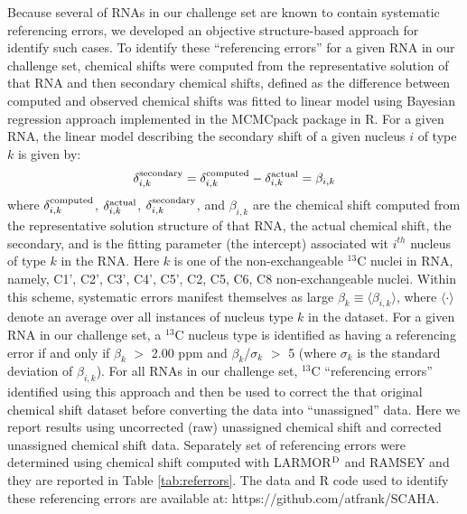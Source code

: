\documentclass[journal=jcisd8,manuscript=article,layout=onecolumn]{achemso}
\begin{document}
Because several of RNAs in our challenge set are known to contain systematic referencing errors\cite{aeschbacher2012procedure}, we developed an objective structure-based approach for identify such cases. To identify these ``referencing errors'' for a given RNA in our challenge set, chemical shifts were computed from the representative solution of that  RNA and then secondary chemical shifts, defined as the difference between computed and  observed chemical shifts was fitted to linear model using Bayesian regression approach implemented in the MCMCpack package in R\cite{martin2011mcmcpack}. For a given RNA, the linear model describing the secondary shift of a given nucleus $i$ of type $k$ is given by:
\begin{equation}\label{eq:wmae} 
\delta^{\rm secondary}_{i, k} =  \delta^{\rm computed}_{i, k} - \delta^{\rm actual}_{i, k} = \beta_{i, k}
\end{equation}
where $\delta^{\rm computed}_{i, k}$, $\delta^{\rm actual}_{i, k}$, $\delta^{\rm secondary}_{i, k}$, and $\beta_{i, k}$ are the chemical shift computed from the representative solution structure of that RNA, the actual chemical shift,  the secondary, and  is the fitting parameter (the intercept) associated wit $i^{th}$ nucleus of type $k$ in the RNA. Here $k$ is one of the non-exchangeable $^{13}$C nuclei in RNA, namely, C1', C2', C3', C4', C5', C2, C5, C6, C8 non-exchangeable nuclei. Within this scheme, systematic errors manifest themselves as large $\beta_{k} \equiv \langle\beta_{i, k} \rangle$, where $\langle\cdot \rangle$ denote an average over all instances of nucleus type $k$ in the dataset. For a given RNA in our challenge set, a $^{13}$C nucleus type is identified as having a referencing error if and only if $\beta_{k}$  $>$ 2.00 ppm  and $\beta_{k}$/$\sigma_{k}$ $>$ 5 (where $\sigma_{k}$ is the standard deviation of  $\beta_{i, k}$). For all RNAs in our challenge set, $^{13}$C ``referencing errors'' identified using this approach and then be used to correct the that original chemical shift dataset before converting the data into ``unassigned'' data. Here we report results using uncorrected (raw) unassigned chemical shift and corrected unassigned chemical shift data. Separately set of referencing errors were determined using chemical shift computed with LARMOR$^{\rm D}$ and RAMSEY and they are reported in Table \ref{tab:referrors}. The data and R code  used to identify these referencing errors are available at: https://github.com/atfrank/SCAHA.
\end{document}
